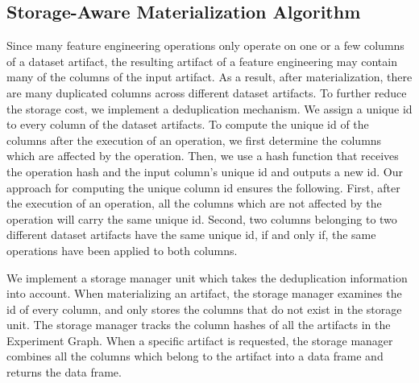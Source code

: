 \subsection{Storage-Aware Materialization Algorithm}
Since many feature engineering operations only operate on one or a few columns of a dataset artifact, the resulting artifact of a feature engineering may contain many of the columns of the input artifact.
As a result, after materialization, there are many duplicated columns across different dataset artifacts.
To further reduce the storage cost, we implement a deduplication mechanism.
We assign a unique id to every column of the dataset artifacts.
To compute the unique id of the columns after the execution of an operation, we first determine the columns which are affected by the operation.
Then, we use a hash function that receives the operation hash and the input column's unique id and outputs a new id.
Our approach for computing the unique column id ensures the following.
First, after the execution of an operation, all the columns which are not affected by the operation will carry the same unique id.
Second, two columns belonging to two different dataset artifacts have the same unique id, if and only if, the same operations have been applied to both columns.

We implement a storage manager unit which takes the deduplication information into account.
When materializing an artifact, the storage manager examines the id of every column, and only stores the columns that do not exist in the storage unit.
The storage manager tracks the column hashes of all the artifacts in the Experiment Graph.
When a specific artifact is requested, the storage manager combines all the columns which belong to the artifact into a data frame and returns the data frame.

